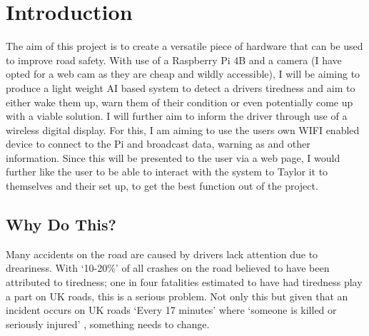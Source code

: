 \chapter*{Introduction}
The aim of this project is to create a versatile piece of hardware that can be used to improve road safety.
With use of a Raspberry Pi 4B and a camera (I have opted for a web cam as they are cheap and wildly accessible),
I will be aiming to produce a light weight AI based system to detect a drivers tiredness and aim to either wake
them up, warn them of their condition or even potentially come up with a viable solution. I will further aim to
inform the driver through use of a wireless digital display. For this, I am aiming to use the users own WIFI
enabled device to connect to the Pi and broadcast data, warning as and other information. Since this will be
presented to the user via a web page, I would further like the user to be able to interact with the system to
Taylor it to themselves and their set up, to get the best function out of the project.

\section{Why Do This?}
Many accidents on the road are caused by drivers lack attention due to dreariness. With ‘10-20\%’ \cite{brake_fatigue} of all
crashes on the road believed to have been attributed to tiredness; one in four fatalities estimated to have had
tiredness play a part on UK roads, this is a serious problem. Not only this but given that an incident occurs on
UK roads ‘Every 17 minutes’ \cite{road_safety} where ‘someone is killed or seriously injured’ \cite{road_safety}, something needs to change. 